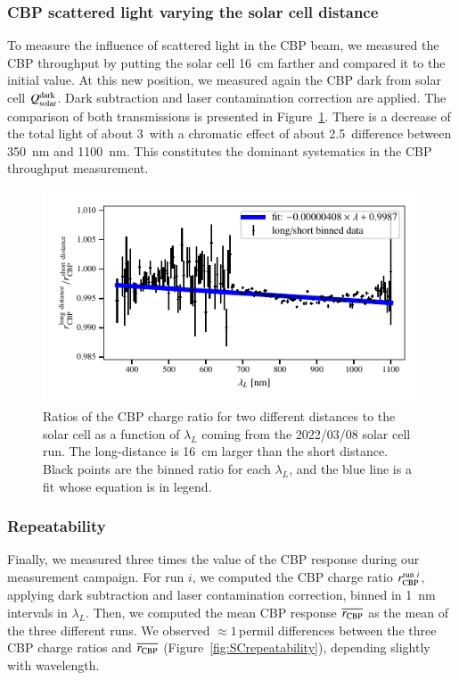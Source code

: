 \subsubsection{CBP scattered light varying the solar cell distance}

To measure the influence of scattered light in the CBP beam, we measured the CBP throughput by putting the solar cell \SI{16}{\cm} farther and compared it to the initial value. At this new position, we measured again the CBP dark from solar cell $Q_{\mathrm{solar}}^{\rm dark}$. Dark subtraction and laser contamination correction are applied. The comparison of both transmissions is presented in Figure~\ref{fig:sc_distance}. There is a decrease of the total light of about 3\textperthousand\ with a chromatic effect of about 2.5\textperthousand\ difference between \SI{350}{\nano\meter} and \SI{1100}{\nano\meter}. This constitutes the dominant systematics in the CBP throughput measurement.

\begin{figure}[h]
    \centering
    \includegraphics[width=\columnwidth]{fig/sc_distance.pdf}
    \caption{Ratios of the CBP charge ratio for two different distances to the solar cell as a function of $\lambda_L$ coming from the 2022/03/08 solar cell run. The long-distance is \SI{16}{\cm} larger than the short distance. Black points are the binned ratio for each $\lambda_L$, and the blue line is a fit whose equation is in legend.}
    \label{fig:sc_distance}
\end{figure}

\subsubsection{Repeatability}

Finally, we measured three times the value of the CBP response during our measurement campaign. For run $i$, we computed the CBP charge ratio $r_{\rm CBP}^{\mathrm{run}\ i}$, applying dark subtraction and laser contamination correction, binned in \SI{1}{\nano\meter} intervals in $\lambda_L$. Then, we computed the mean CBP response $\overline{r_{\rm CBP}}$ as the mean of the three different runs. We observed $\approx 1$\,permil differences between the three CBP charge ratios and $\overline{r_{\rm CBP}}$ (Figure~\ref{fig:SCrepeatability}), depending slightly with wavelength.


